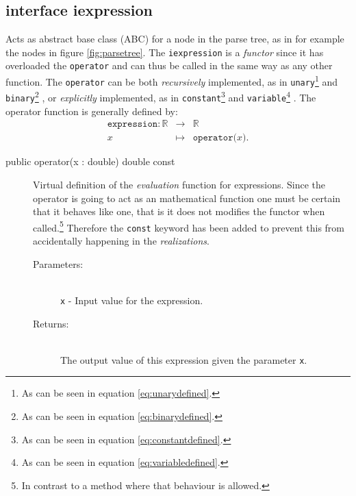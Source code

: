 \documentclass[a4paper,11pt]{kth-mag}
\newcommand{\RR}{\ensuremath{\mathbb{R}}}
\begin{document}
\subsection{interface iexpression}
\label{sec:iexpression}
Acts as abstract base class (ABC) for a node in the parse
tree, as in for example the nodes in figure \ref{fig:parsetree}. The
\texttt{iexpression} is a \emph{functor} since it has overloaded the
\texttt{operator} and can thus be called in the same way as any other function.
The \texttt{operator} can be both 
\emph{recursively} implemented, as in
    \texttt{unary}\footnote{As can be seen in equation \ref{eq:unarydefined}.} 
    and
    \texttt{binary}\footnote{As can be seen in equation \ref{eq:binarydefined}.}
, or
\emph{explicitly} implemented, as in 
    \texttt{constant}\footnote{As can be seen in equation \ref{eq:constantdefined}.} 
    and
    \texttt{variable}\footnote{As can be seen in equation \ref{eq:variabledefined}.}
.
The operator function is generally defined by:
\begin{eqnarray}
    \label{eq:expressiondefined}
    \texttt{expression}: \RR &\rightarrow& \RR \nonumber \\
    x &\mapsto& \texttt{operator(}x\texttt{)} .
\end{eqnarray}

\begin{description}
    \item[public operator(x : double) double const] 
    Virtual definition of the \emph{evaluation} function for expressions. 
    Since the operator is going to act as an mathematical function one must be certain
    that it behaves like one, that is it does not modifies the functor when
    called.\footnote{In contrast to a method where that behaviour is allowed.}
    Therefore the \texttt{const} keyword has been added to prevent this
    from accidentally happening in the \emph{realizations}.
    \begin{description}
        \item[Parameters:]~\\
            \verb+x+ - Input value for the expression. 
        \item[Returns:]~\\
            The output value of this expression given the parameter \texttt{x}.
    \end{description}
\end{description}
\end{document}
